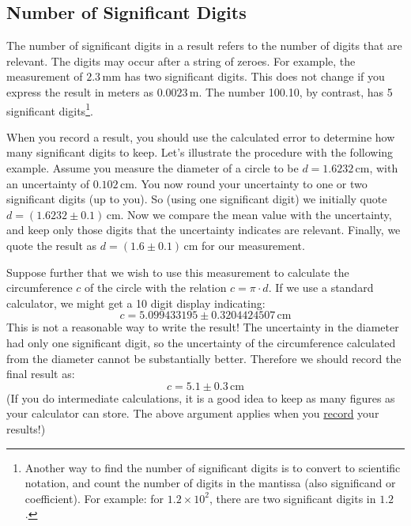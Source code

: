 \subsection{Number of Significant Digits}

The number of significant digits in a result refers to the number of digits that are relevant. The digits may occur after a string of zeroes. For example, the measurement of $2.3\,\mathrm{mm}$ has two significant digits. This does not change if you express the result in meters as $0.0023\,\mathrm{m}$. The number 100.10, by contrast, has 5 significant digits\footnote{Another way to find the number of significant digits is to convert to scientific notation, and count the number of digits in the mantissa (also significand or coefficient). For example: for $1.2\times 10^{2}$, there are two significant digits in $1.2$. }.

When you record a result, you should use the calculated error to determine how many significant digits to keep. Let's illustrate the procedure with the following example. Assume you measure the diameter of a circle to be $d = 1.6232\,\mathrm{cm}$, with an uncertainty of $0.102\,\mathrm{cm}$. You now round your uncertainty to one or two significant digits (up to you). So (using one significant digit) we initially quote $d = (1.6232 \pm 0.1)\,\mathrm{cm}$. Now we compare the mean value with the uncertainty, and keep only those digits that the uncertainty indicates are relevant. Finally, we quote the result as $d = (1.6 \pm 0.1)\,\mathrm{cm}$ for our measurement.

Suppose further that we wish to use this measurement to calculate the circumference $c$ of the circle with the relation $c = \pi\cdot d$. If we use a standard calculator, we might get a 10 digit display indicating:
\begin{equation}
    c = 5.099433195\pm 0.3204424507\,\mathrm{cm}
\end{equation}
This is not a reasonable way to write the result!  The uncertainty in the diameter had only one significant digit, so the uncertainty of the circumference calculated from the diameter cannot be substantially better. Therefore we should record the final result as:
\begin{equation}
    c = 5.1\pm 0.3\,\mathrm{cm}
\end{equation}
(If you do intermediate calculations, it is a good idea to keep as many figures as your calculator can store. The above argument applies when you \underline{record} your results!)


